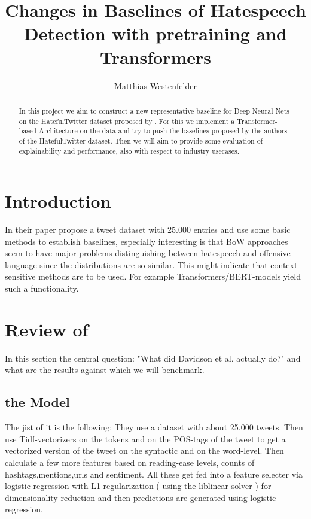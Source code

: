 \documentclass[11pt,a4paper]{article}
\title{Changes in Baselines of Hatespeech Detection with pretraining and Transformers}
\author{Matthias Westenfelder}
\begin{document}
\maketitle
\tableofcontents
\begin{abstract}
In this project we aim to construct a new representative baseline for Deep Neural Nets on the HatefulTwitter dataset proposed by \cite{auto_hatespeech}.
For this we implement a Transformer-based Architecture on the data and try to push the baselines proposed by the authors of the HatefulTwitter dataset.
Then we will aim to provide some evaluation of explainability and performance, also with respect to industry usecases.
\end{abstract}
 

\section{Introduction}
In their paper \cite{auto_hatespeech} propose a tweet dataset with 25.000 entries and use some basic methods to establish baselines,
especially interesting is that BoW approaches seem to have major problems distinguishing between hatespeech and offensive language since the distributions are so similar.
This might indicate that context sensitive methods are to be used. For example Transformers/BERT-models yield such a functionality.

\section{Review of \cite{auto_hatespeech}}
In this section the central question: "What did Davidson et al. actually do?" and what are the results against which we will benchmark.

\subsection{the Model}
The jist of it is the following:
They use a dataset with about 25.000 tweets. 
Then use Tidf-vectorizers on the tokens and on the POS-tags of the tweet to get a vectorized 
version of the tweet on the syntactic and on the word-level.
Then calculate a few more features based on reading-ease levels, counts of hashtags,mentions,urls and sentiment.
All these get fed into a feature selecter via logistic regression with L1-regularization ( using the liblinear solver )
for dimensionality reduction and then predictions are generated using logistic regression.
\end{document}
